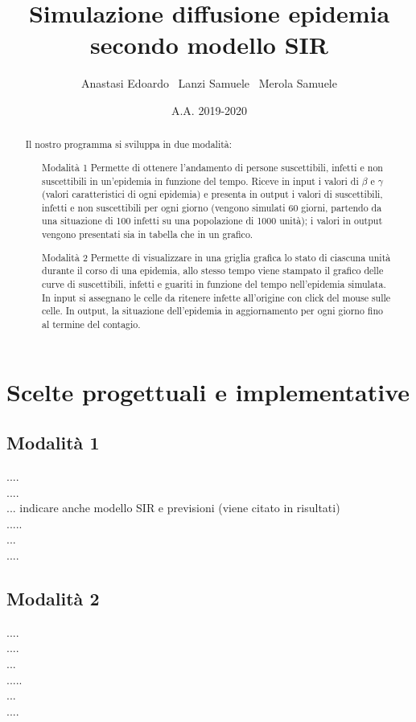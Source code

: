 \documentclass[a4paper,10 pt]{article}
\title{\huge{Simulazione diffusione epidemia secondo modello SIR}}
\author{Anastasi Edoardo \  Lanzi Samuele \ Merola Samuele}
\date{A.A. 2019-2020}
\begin{document}
\maketitle 


\begin{abstract}
 Il nostro programma si sviluppa in due modalità:
 \begin{itemize}
	\item[Modalità 1] Permette di ottenere l'andamento di persone suscettibili, infetti e non suscettibili in un'epidemia in funzione del tempo. Riceve in input i valori di $\beta$ e $\gamma$ (valori caratteristici di ogni epidemia) e presenta in output i valori di suscettibili, infetti e non suscettibili per ogni giorno (vengono simulati 60 giorni, partendo da una situazione di 100 infetti su una popolazione di 1000 unità); i valori in output vengono presentati sia in tabella che in un grafico.
 \item[Modalità 2] Permette di visualizzare in una griglia grafica lo stato di ciascuna unità durante il corso di una epidemia, allo stesso tempo viene stampato il grafico delle curve di suscettibili, infetti e guariti in funzione del tempo nell'epidemia simulata. In input si assegnano le celle da ritenere infette all'origine con click del mouse sulle celle. In output, la situazione dell'epidemia in aggiornamento per ogni giorno fino al termine del contagio.
  \end{itemize}
\end{abstract}



\section{Scelte progettuali e implementative} 
\subsection{Modalità 1}
....
\ \\
....
\ \\
...  indicare anche modello SIR e previsioni (viene citato in risultati)
\ \\
.....
\ \\
...
\ \\
....
\subsection{Modalità 2}
....
\ \\
....
\ \\
...
\ \\
.....
\ \\
...
\ \\
....
\end{document}
